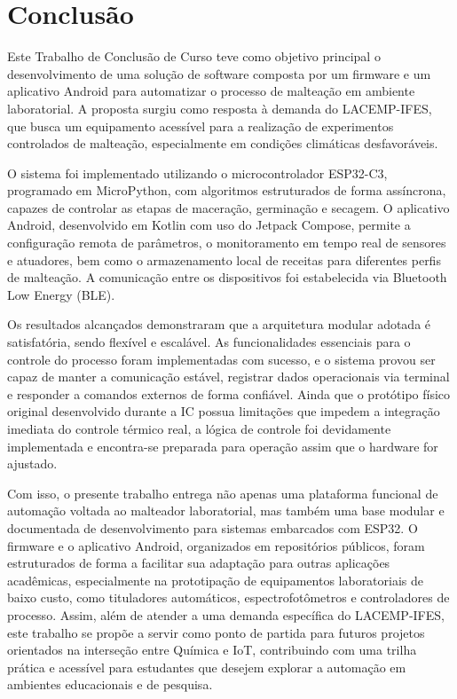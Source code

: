 \chapter[Conclusão]{Conclusão}

Este Trabalho de Conclusão de Curso teve como objetivo principal o desenvolvimento de uma solução de software composta por um firmware e um aplicativo Android para automatizar o processo de malteação em ambiente laboratorial. A proposta surgiu como resposta à demanda do LACEMP-IFES, que busca um equipamento acessível para a realização de experimentos controlados de malteação, especialmente em condições climáticas desfavoráveis.

O sistema foi implementado utilizando o microcontrolador ESP32-C3, programado em MicroPython, com algoritmos estruturados de forma assíncrona, capazes de controlar as etapas de maceração, germinação e secagem. O aplicativo Android, desenvolvido em Kotlin com uso do Jetpack Compose, permite a configuração remota de parâmetros, o monitoramento em tempo real de sensores e atuadores, bem como o armazenamento local de receitas para diferentes perfis de malteação. A comunicação entre os dispositivos foi estabelecida via Bluetooth Low Energy (BLE).

Os resultados alcançados demonstraram que a arquitetura modular adotada é satisfatória, sendo flexível e escalável. As funcionalidades essenciais para o controle do processo foram implementadas com sucesso, e o sistema provou ser capaz de manter a comunicação estável, registrar dados operacionais via terminal e responder a comandos externos de forma confiável. Ainda que o protótipo físico original desenvolvido durante a IC possua limitações que impedem a integração imediata do controle térmico real, a lógica de controle foi devidamente implementada e encontra-se preparada para operação assim que o hardware for ajustado.

Com isso, o presente trabalho entrega não apenas uma plataforma funcional de automação voltada ao malteador laboratorial, mas também uma base modular e documentada de desenvolvimento para sistemas embarcados com ESP32. O firmware e o aplicativo Android, organizados em repositórios públicos, foram estruturados de forma a facilitar sua adaptação para outras aplicações acadêmicas, especialmente na prototipação de equipamentos laboratoriais de baixo custo, como tituladores automáticos, espectrofotômetros e controladores de processo. Assim, além de atender a uma demanda específica do LACEMP-IFES, este trabalho se propõe a servir como ponto de partida para futuros projetos orientados na interseção entre Química e IoT, contribuindo com uma trilha prática e acessível para estudantes que desejem explorar a automação em ambientes educacionais e de pesquisa.


